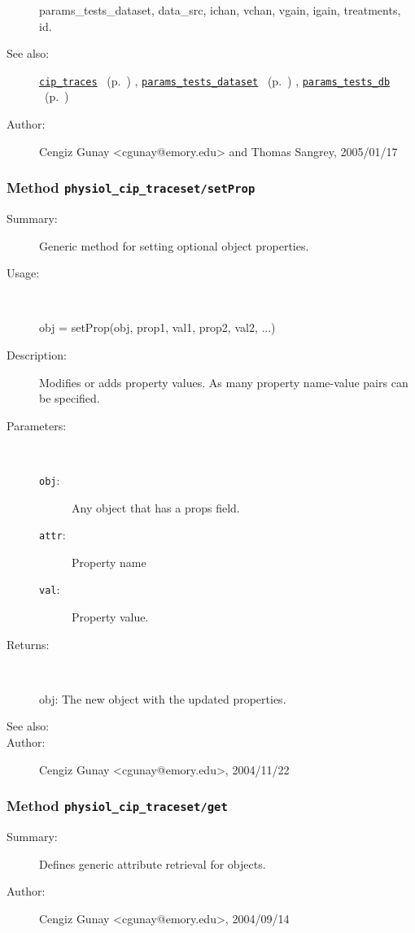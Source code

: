 \begin{description}
	params\_tests\_dataset,
	data\_src, ichan, vchan, vgain, igain, treatments, id.
%
%
\item[See also:]%
\hyperlink{ref_cip_traces}{\texttt{cip\_traces}}%
\ (p.~\pageref{ref_cip_traces})%
%
, \hyperlink{ref_params_tests_dataset}{\texttt{params\_tests\_dataset}}%
\ (p.~\pageref{ref_params_tests_dataset})%
%
, \hyperlink{ref_params_tests_db}{\texttt{params\_tests\_db}}%
\ (p.~\pageref{ref_params_tests_db})%
%
%
\item[Author:]%
Cengiz Gunay <cgunay@emory.edu> and Thomas Sangrey, 2005/01/17%
\end{description}
\methodline%
\subsubsection[Method \texttt{setProp}]{Method \texttt{physiol\_cip\_traceset/setProp}}%
%
\label{ref_physiol_cip_traceset__setProp}%
\hypertarget{ref_physiol_cip_traceset__setProp}{}%
\begin{description}
\item[Summary:]Generic method for setting optional object properties.
%
\item[Usage:]~%
\begin{lyxcode}%
obj = setProp(obj, prop1, val1, prop2, val2, ...)
%
\end{lyxcode}%
%
\item[Description:]%
Modifies or adds property values. As many property name-value 
 pairs can be specified.
\item[Parameters:]~
\begin{description}%
\item[\texttt{obj}:]
 Any object that has a props field.
\item[\texttt{attr}:]
 Property name
\item[\texttt{val}:]
 Property value.
\end{description}%
%
\item[Returns:]~

	obj: The new object with the updated properties.
%
%
\item[See also:]%
%
\item[Author:]%
Cengiz Gunay <cgunay@emory.edu>, 2004/11/22%
\end{description}
\methodline%
\subsubsection[Method \texttt{get}]{Method \texttt{physiol\_cip\_traceset/get}}%
%
\label{ref_physiol_cip_traceset__get}%
\hypertarget{ref_physiol_cip_traceset__get}{}%
\begin{description}
\item[Summary:]Defines generic attribute retrieval for objects.
%
%
%
%
%
%
%
\item[Author:]%
Cengiz Gunay <cgunay@emory.edu>, 2004/09/14%
\end{description}
\methodline%
